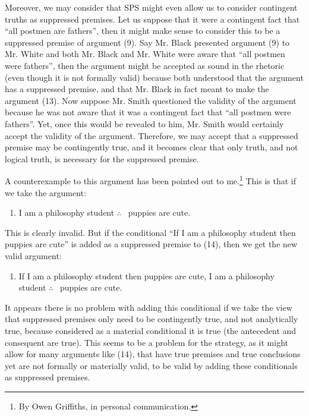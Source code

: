 Moreover, we may consider that SPS might even allow us to consider
contingent truths as suppressed premises. Let us suppose that it were a
contingent fact that ``all postmen are fathers'', then it might make
sense to consider this to be a suppressed premise of argument (9). Say
Mr. Black presented argument (9) to Mr. White and both Mr. Black and Mr.
White were aware that ``all postmen were fathers'', then the argument
might be accepted as sound in the rhetoric (even though it is not
formally valid) because both understood that the argument has a
suppressed premise, and that Mr. Black in fact meant to make the
argument (13). Now suppose Mr. Smith questioned the validity of the
argument because he was not aware that it was a contingent fact that
``all postmen were fathers''. Yet, once this would be revealed to him,
Mr. Smith would certainly accept the validity of the argument.
Therefore, we may accept that a suppressed premise may be contingently
true, and it becomes clear that only truth, and not logical truth, is
necessary for the suppressed premise.

A counterexample to this argument has been pointed out to me.\footnote{By
  Owen Griffiths, in personal communication.} This is that if we take
the argument:

\begin{enumerate}[leftmargin=42pt] 
\def\labelenumi{(\arabic{enumi})}
\setcounter{enumi}{13}
\item
  I am a philosophy student $\therefore$ \ puppies are cute.
\end{enumerate}

\noindent This is clearly invalid. But if the conditional ``If I am a philosophy
student then puppies are cute'' is added as a suppressed premise to
(14), then we get the new valid argument:

\begin{enumerate}[leftmargin=42pt] 
\def\labelenumi{(\arabic{enumi})}
\setcounter{enumi}{14}
\item
  If I am a philosophy student then puppies are cute, I am a
philosophy student $\therefore$ \ puppies are cute.
\end{enumerate}

\noindent It appears there is no problem with adding this conditional if we take
the view that suppressed premises only need to be contingently true, and
not analytically true, because considered as a material conditional it
is true (the antecedent and consequent are true). This seems to be a
problem for the strategy, as it might allow for many arguments like
(14), that have true premises and true conclusions yet are not formally
or materially valid, to be valid by adding these conditionals as
suppressed premises.


